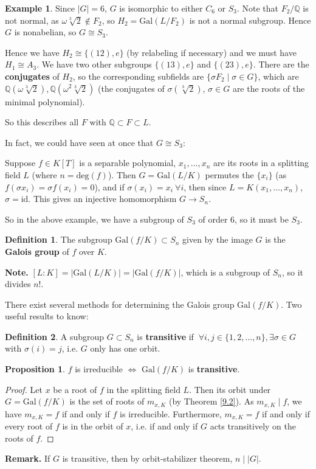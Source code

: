 \documentclass{article}
\theoremstyle{definition}
\newtheorem{prop}[theorem]{Proposition}
\newtheorem{example}{Example}[section]
\newtheorem{defn}{Definition}[section]
\begin{document}
\begin{example}
    Since $|G|=6$, $G$ is isomorphic to either $C_6$ or $S_3$. Note that $F_2 / \mathbb{Q}$ is not normal, as $\omega \sqrt[3]{2} \not\in F_2$, so $H_2 = \text{Gal}(L/F_2)$ is not a normal subgroup. Hence $G$ is nonabelian, so $G \cong S_3$.
    
    Hence we have $H_2 \cong \{(12),e\}$ (by relabeling if necessary) and we must have $H_1 \cong A_3$. We have two other subgroups $\{(13), e\}$ and $\{(23),e\}$. There are the \textbf{conjugates} of $H_2$, so the corresponding subfields are $\{\sigma F_2 \mid \sigma \in G\}$, which are $\mathbb{Q}(\omega \sqrt[3]{2}), \mathbb{Q}(\omega^2 \sqrt[3]{2})$ (the conjugates of $\sigma(\sqrt[3]{2})$, $\sigma \in G$ are the roots of the minimal polynomial).

    So this describes all $F$ with $\mathbb{Q} \subset F \subset L$.
\end{example}

In fact, we could have seen at once that $G \cong S_3$:

Suppose $f \in K[T]$ is a separable polynomial, $x_1,\ldots,x_n$ are its roots in a splitting field $L$ (where $n=\text{deg}(f)$). Then $G = \text{Gal}(L/K)$ permutes the $\{x_i\}$ (as $f(\sigma x_i) = \sigma f(x_i) = 0$), and if $\sigma(x_i) = x_i ~\forall i$, then since $L = K(x_1,\ldots,x_n)$, $\sigma = \text{id}$. This gives an injective homomorphism $G \to S_n$. 

So in the above example, we have a subgroup of $S_3$ of order $6$, so it must be 
$S_3$.

\begin{defn}
    The subgroup $\text{Gal}(f/K) \subset S_n$ given by the image $G$ is the \textbf{Galois group} of $f$ over $K$.
\end{defn}
\textbf{Note.} $[L:K] = |\text{Gal}(L/K)| = |\text{Gal}(f/K)|$, which is a subgroup of $S_n$, so it divides $n!$.

\vspace{1mm}

There exist several methods for determining the Galois group $\text{Gal}(f/K)$. Two useful results to know:
\begin{defn}
    A subgroup $G \subset S_n$ is \textbf{transitive} if $~\forall i,j \in \{1,2,\ldots,n\}, \exists \sigma \in G$ with $\sigma(i)=j$, i.e. $G$ only has one orbit.
\end{defn}
\begin{prop}
    $f$ is irreducible $\iff$ $\text{Gal}(f/K)$ is \textbf{transitive}.
\end{prop}
\begin{proof}
    Let $x$ be a root of $f$ in the splitting field $L$. Then its orbit under $G = \text{Gal}(f/K)$ is the set of roots of $m_{x,K}$ (by Theorem \ref{9.2}). As $m_{x,K} \mid f$, we have $m_{x,K} = f$ if and only if $f$ is irreducible. Furthermore, $m_{x,K} = f$ if and only if every root of $f$ is in the orbit of $x$, i.e. if and only if $G$ acts transitively on the roots of $f$.
\end{proof}
\textbf{Remark.} If $G$ is transitive, then by orbit-stabilizer theorem, $n \mid |G|$.
\end{document}
